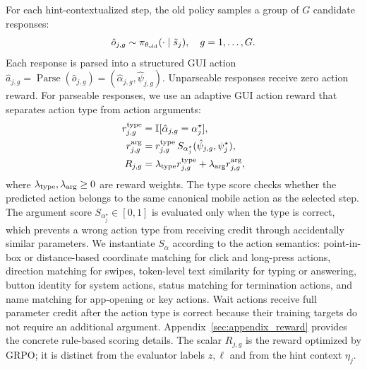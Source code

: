 For each hint-contextualized step, the old policy samples a group of $G$ candidate responses:
\begin{equation}
\label{eq:hint-grpo-sampling}
    \hat{o}_{j,g}\sim \pi_{\theta_{\rm old}}(\cdot\mid\tilde{s}_j),
    \quad g=1,\ldots,G.
\end{equation}
Each response is parsed into a structured GUI action
$\hat a_{j,g}=\operatorname{Parse}(\hat{o}_{j,g})=(\hat{\alpha}_{j,g},\hat{\psi}_{j,g})$.
Unparseable responses receive zero action reward. For parseable responses, we use an adaptive GUI action reward that separates action type from action arguments:
\begin{equation}
\label{eq:gui-reward}
\begin{aligned}
    r^{\rm type}_{j,g}
    &=\mathbb{I}[\hat{\alpha}_{j,g}=\alpha_j^\star],\\
    r^{\rm arg}_{j,g}
    &=r^{\rm type}_{j,g}\,
      S_{\alpha_j^\star}(\hat{\psi}_{j,g},\psi_j^\star),\\
    R_{j,g}
    &=\lambda_{\rm type}r^{\rm type}_{j,g}
      +\lambda_{\rm arg}r^{\rm arg}_{j,g},
\end{aligned}
\end{equation}
where $\lambda_{\rm type},\lambda_{\rm arg}\geq0$ are reward weights. The type score checks whether the predicted action belongs to the same canonical mobile action as the selected step. The argument score $S_{\alpha_j^\star}\in[0,1]$ is evaluated only when the type is correct, which prevents a wrong action type from receiving credit through accidentally similar parameters. We instantiate $S_{\alpha}$ according to the action semantics: point-in-box or distance-based coordinate matching for click and long-press actions, direction matching for swipes, token-level text similarity for typing or answering, button identity for system actions, status matching for termination actions, and name matching for app-opening or key actions. Wait actions receive full parameter credit after the action type is correct because their training targets do not require an additional argument. Appendix~\ref{sec:appendix_reward} provides the concrete rule-based scoring details. The scalar $R_{j,g}$ is the reward optimized by GRPO; it is distinct from the evaluator labels $z,\ell$ and from the hint context $\eta_j$.

